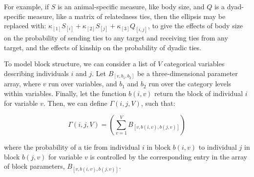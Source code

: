\documentclass[Afour,sageh,times]{sagej}
\begin{document}
For example, if $S$ is an animal-specific measure, like body size, and $Q$ is a dyad-specific measure, like a matrix of relatedness ties, then the ellipsis  may be replaced with:  $\kappa_{[1]}S_{[i]} + \kappa_{[2]}S_{[j]} + \kappa_{[3]}Q_{[i,j]}$, to give the effects of body size on the probability of sending ties to any target and receiving ties from any target, and the effects of kinship on the probability of dyadic ties.

To model block structure, we can consider a list of $V$ categorical variables describing individuals $i$ and $j$. Let $B_{[v,b_1,b_2]}$ be a three-dimensional parameter array, where $v$ run over variables, and $b_1$ and $b_2$ run over the category levels within variables. Finally, let the function  $b(i,v)$ return the block of individual $i$ for variable $v$. Then, we can define $\Gamma(i,j,V)$, such that: 
\begin{ceqn}
\begin{equation}\label{link}
\Gamma(i,j,V) = \left(\sum_{v=1}^{V} B_{[v,b(i,v),b(j,v)]} \right)
\end{equation}
\end{ceqn}
where the probability of a tie from individual $i$ in block $b(i,v)$ to individual $j$ in block $b(j,v)$ for variable $v$ is controlled by the corresponding entry in the array of block parameters, $B_{[v,b(i,v),b(j,v)]}$.\\
\end{document}
